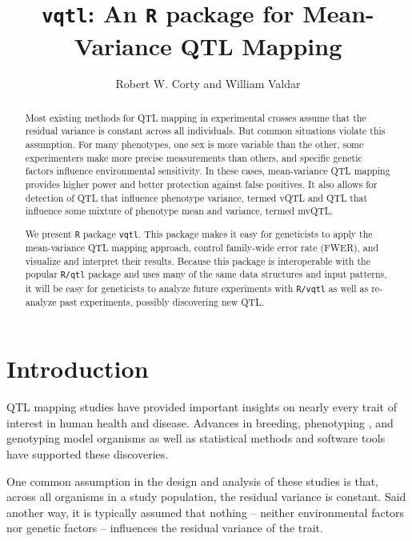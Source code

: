 \documentclass{article}
\title{\texttt{vqtl}: An \texttt{R} package for Mean-Variance QTL Mapping}
\author{Robert W. Corty and William Valdar}
\begin{document}
\maketitle


\begin{abstract}
Most existing methods for QTL mapping in experimental crosses assume that the residual variance is constant across all individuals.
But common situations violate this assumption.
For many phenotypes, one sex is more variable than the other, some experimenters make more precise measurements than others, and specific genetic factors influence environmental sensitivity.
In these cases, mean-variance QTL mapping provides higher power and better protection against false positives.
It also allows for detection of QTL that influence phenotype variance, termed vQTL and QTL that influence some mixture of phenotype mean and variance, termed mvQTL.

We present \texttt{R} package \texttt{vqtl}.
This package makes it easy for geneticists to apply the mean-variance QTL mapping approach, control family-wide error rate (FWER), and visualize and interpret their results.
Because this package is interoperable with the popular \texttt{R/qtl} package and uses many of the same data structures and input patterns, it will be easy for geneticists to analyze future experiments with \texttt{R/vqtl} as well as re-analyze past experiments, possibly discovering new QTL.
\end{abstract}



\section*{Introduction}

QTL mapping studies have provided important insights on nearly every trait of interest in human health and disease.
Advances in breeding, phenotyping \citep{Yang2014a}, and genotyping \citep{Williams1990} model organisms as well as statistical methods \citep{Lander1989a} and software tools \citep{Broman2003} have supported these discoveries.

One common assumption in the design and analysis of these studies is that, across all organisms in a study population, the residual variance is constant.
Said another way, it is typically assumed that nothing -- neither environmental factors nor genetic factors -- influences the residual variance of the trait.
\end{document}
